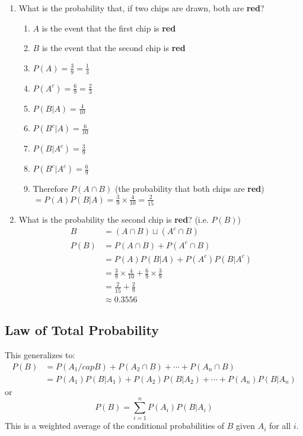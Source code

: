 \documentclass[12pt]{article}
\begin{document}
\begin{enumerate}
\begin{enumerate}
                \end{enumerate}
                \item What is the probability that, if two chips are drawn, both are \textbf{red}?
                \begin{enumerate}
                    \item $A$ is the event that the first chip is \textbf{red}
                    \item $B$ is the event that the second chip is \textbf{red}
                    \item $P(A) = \frac{3}{9} = \frac{1}{3}$
                    \item $P(A^c) = \frac{6}{9} = \frac{2}{3}$
                    \item $P(B|A) = \frac{4}{10}$
                    \item $P(B^c|A) = \frac{6}{10}$
                    \item $P(B|A^c) = \frac{3}{9}$
                    \item $P(B^c|A^c) = \frac{6}{9}$
                    \item Therefore $P(A \cap B)$ (the probability that both chips are \textbf{red}) $= P(A)P(B|A) = \frac{3}{9}\times\frac{4}{10} = \frac{2}{15}$
                \end{enumerate}
                \item What is the probability the second chip is \textbf{red}? (i.e. $P(B)$)
                \begin{align*}
                    B &= (A \cap B) \sqcup (A^c \cap B)\\
                    P(B) &= P(A \cap B) + P(A^c \cap B)\\
                    &= P(A)P(B|A) + P(A^c)P(B|A^c)\\
                    &= \frac{3}{9}\times\frac{4}{10} + \frac{6}{9}\times\frac{3}{9}\\
                    &= \frac{2}{15} + \frac{2}{9}\\
                    &\approx 0.3556
                \end{align*}
            \end{enumerate}
        \subsection{Law of Total Probability}
            This generalizes to:
            \begin{align*}
                P(B) &= P(A_1 /cap B) + P(A_2 \cap B) + \cdots + P(A_n \cap B)\\
                &= P(A_1)P(B|A_1) + P(A_2)P(B|A_2) + \cdots + P(A_n)P(B|A_n)
            \end{align*}
            or
            \begin{equation}
                P(B) = \sum_{i=1}^n P(A_i)P(B|A_i)
            \end{equation}
            This is a weighted average of the conditional probabilities of $B$ given $A_i$ for all $i$.
\end{document}
